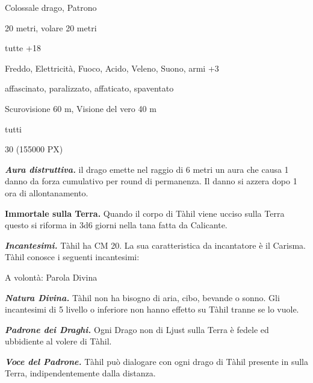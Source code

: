 \begin{multicols}{2}
{
\begin{description}[noitemsep, topsep=0pt, parsep=0pt, partopsep=0pt, itemsep=1pt, leftmargin=2.35cm,  labelwidth=2.2cm, itemindent=0cm, listparindent=0pt] %
\setlength{\baselineskip}{10pt}
\item[\textbf{Taglia/Tipo}] Colossale drago, Patrono
\item[\textbf{Caratt.}] 
\item[\textbf{Punti Ferita}] 
\item[\textbf{Movimento}] 20 metri, volare 20 metri
\item[\textbf{Tiri Salvez.}] 
\item[\textbf{Comp.}] tutte +18
\item[\textbf{Imm. Danni}] Freddo, Elettricità, Fuoco, Acido, Veleno, Suono, armi +3
\item[\textbf{Immunità}] affascinato, paralizzato, affaticato, spaventato
\item[\textbf{Sensi}] Scurovisione 60 m, Visione del vero 40 m
\item[\textbf{Linguaggi}] tutti
\item[\textbf{Sfida}] 30 (155000 PX)
\end{description}
\smallskip

\emph{\textbf{Aura distruttiva.}} il drago emette nel raggio di 6 metri un aura che causa 1 danno da forza cumulativo per round di permanenza. Il danno si azzera dopo 1 ora di allontanamento.

\textbf{Immortale sulla Terra.} Quando il corpo di Tàhil viene ucciso sulla Terra questo si riforma in 3d6 giorni nella tana fatta da Calicante.

\emph{\textbf{Incantesimi.}} Tàhil ha CM 20. La sua caratteristica da incantatore è il Carisma. Tàhil conosce i seguenti incantesimi:

A volontà: Parola Divina

\emph{\textbf{Natura Divina.}} Tàhil non ha bisogno di aria, cibo, bevande o sonno. Gli incantesimi di 5 livello o inferiore non hanno effetto su Tàhil tranne se lo vuole.

\emph{\textbf{Padrone dei Draghi.}} Ogni Drago non di Ljust sulla Terra è fedele ed ubbidiente al volere di Tàhil.

\emph{\textbf{Voce del Padrone.}} Tàhil può dialogare con ogni drago di Tàhil presente in sulla Terra, indipendentemente dalla distanza.

}
\end{multicols}
